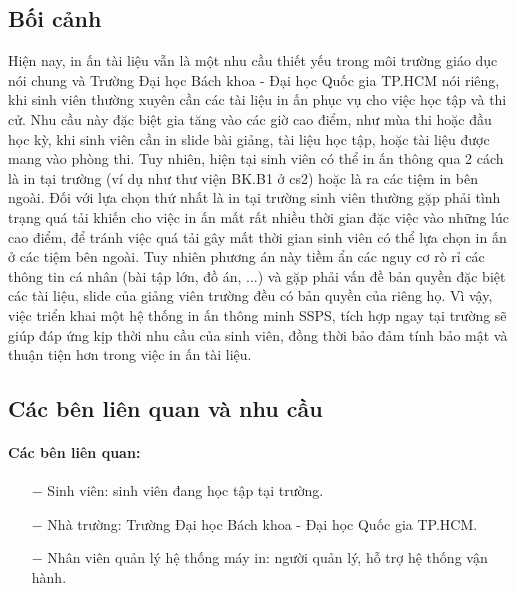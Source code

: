 \documentclass[a4paper]{article}
\begin{document}
\subsection{Bối cảnh}
Hiện nay, in ấn tài liệu vẫn là một nhu cầu thiết yếu trong môi trường giáo dục nói chung và Trường Đại học Bách khoa - Đại học Quốc gia TP.HCM nói riêng, khi sinh viên thường xuyên cần các tài liệu in ấn phục vụ cho việc học tập và thi cử. Nhu cầu này đặc biệt gia tăng vào các giờ cao điểm, như mùa thi hoặc đầu học kỳ, khi sinh viên cần in slide bài giảng, tài liệu học tập, hoặc tài liệu được mang vào phòng thi. Tuy nhiên, hiện tại sinh viên có thể in ấn thông qua 2 cách là in tại trường (ví dụ như thư viện BK.B1 ở cs2) hoặc là ra các tiệm in bên ngoài. Đối với lựa chọn thứ nhất là in tại trường sinh viên thường gặp phải tình trạng quá tải khiến cho việc in ấn mất rất nhiều thời gian đặc việc vào những lúc cao điểm, để tránh việc quá tải gây mất thời gian sinh viên có thể lựa chọn in ấn ở các tiệm bên ngoài. Tuy nhiên phương án này tiềm ẩn các nguy cơ rò rỉ các thông tin cá nhân (bài tập lớn, đồ án, ...) và gặp phải vấn đề bản quyền đặc biệt các tài liệu, slide của giảng viên trường đều có bản quyền của riêng họ. Vì vậy, việc triển khai một hệ thống in ấn thông minh SSPS, tích hợp ngay tại trường sẽ giúp đáp ứng kịp thời nhu cầu của sinh viên, đồng thời bảo đảm tính bảo mật và thuận tiện hơn trong việc in ấn tài liệu.

\subsection{Các bên liên quan và nhu cầu}
\paragraph*{Các bên liên quan:}
\begin{itemize}
    \item[$-$] Sinh viên: sinh viên đang học tập tại trường.
    \item[$-$] Nhà trường: Trường Đại học Bách khoa - Đại học Quốc gia TP.HCM.
    \item[$-$] Nhân viên quản lý hệ thống máy in: người quản lý, hỗ trợ hệ thống vận hành.
\end{itemize}
\end{document}
